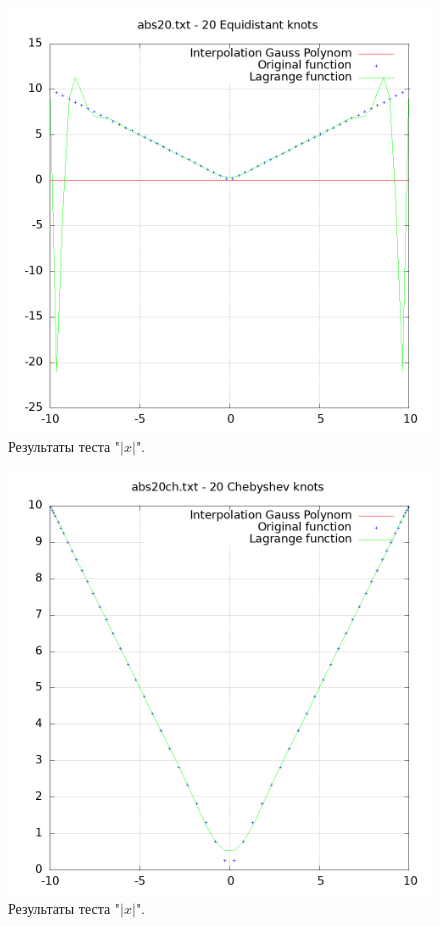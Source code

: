 \documentclass[14pt,a4paper]{extarticle}
\newcommand{\1}{\mathbbm{1}}
\begin{document}
    \begin{figure}
        \centering
        \includegraphics[scale=0.5]{Images/abs20.txt.png}
        \caption{Результаты теста "$|x|$".}
    \end{figure}
    \begin{figure}
        \centering
        \includegraphics[scale=0.5]{Images/abs20ch.txt.png}
        \caption{Результаты теста "$|x|$".}
    \end{figure}
\end{document}
